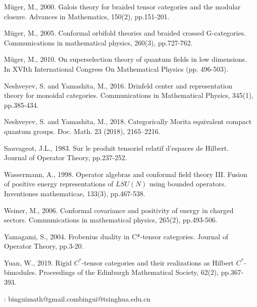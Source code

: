 \documentclass[12pt,a4paper,notitlepage]{article}
\theoremstyle{definition}
\theoremstyle{plain}
\numberwithin{equation}{section}
\begin{document}
\begin{thebibliography}{999999}
Müger, M., 2000. Galois theory for braided tensor categories and the modular closure. Advances in Mathematics, 150(2), pp.151-201.

Müger, M., 2005. Conformal orbifold theories and braided crossed G-categories. Communications in mathematical physics, 260(3), pp.727-762.

Müger, M., 2010. On superselection theory of quantum fields in low dimensions. In XVIth International Congress On Mathematical Physics (pp. 496-503).

Neshveyev, S. and Yamashita, M., 2016. Drinfeld center and representation theory for monoidal categories. Communications in Mathematical Physics, 345(1), pp.385-434.

Neshveyev, S. and Yamashita, M., 2018. Categorically Morita equivalent compact quantum
groups. Doc. Math. 23 (2018), 2165–2216.

Sauvageot, J.L., 1983. Sur le produit tensoriel relatif d'espaces de Hilbert. Journal of Operator Theory, pp.237-252.

Wassermann, A., 1998. Operator algebras and conformal field theory III. Fusion of positive energy representations of $LSU(N)$ using bounded operators. Inventiones mathematicae, 133(3), pp.467-538.

Weiner, M., 2006. Conformal covariance and positivity of energy in charged sectors. Communications in mathematical physics, 265(2), pp.493-506.

Yamagami, S., 2004. Frobenius duality in C*-tensor categories. Journal of Operator Theory, pp.3-20.

Yuan, W., 2019. Rigid $C^*$-tensor categories and their realizations as Hilbert $C^*$-bimodules. Proceedings of the Edinburgh Mathematical Society, 62(2), pp.367-393.

		
		
\end{thebibliography}


: binguimath@gmail.com\qquad bingui@tsinghua.edu.cn
\end{document}

